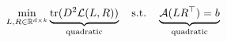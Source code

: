 \documentclass[preview]{standalone}
\begin{document}
\begin{align*}
\special{dvisvgm:raw <g id='unique000'>}\min_{L,R\in\mathbb{R}^{d\times k}}\underbrace{\mathrm{tr}(D^2\mathcal{L}(L,R))}_{\text{quadratic}}\quad\text{s.t.}\quad\underbrace{\mathcal{A}(LR^\top) = b}_{\text{quadratic}}\special{dvisvgm:raw </g>}
\end{align*}
\end{document}
